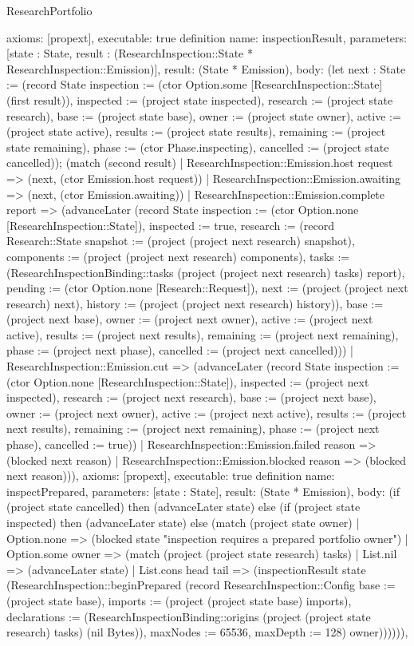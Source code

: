 \begin{lexlean}{ResearchPortfolio}
\begin{semanticmodule}
{ axioms: [propext],
 executable: true
}
definition{
 name: inspectionResult,
 parameters: [state : State, result : (ResearchInspection::State * ResearchInspection::Emission)],
 result: (State * Emission),
 body: (let next : State := (record State {inspection := (ctor Option.some [ResearchInspection::State] (first result)), inspected := (project state inspected), research := (project state research), base := (project state base), owner := (project state owner), active := (project state active), results := (project state results), remaining := (project state remaining), phase := (ctor Phase.inspecting), cancelled := (project state cancelled)}); (match (second result) | ResearchInspection::Emission.host request => (next, (ctor Emission.host request)) | ResearchInspection::Emission.awaiting => (next, (ctor Emission.awaiting)) | ResearchInspection::Emission.complete report => (advanceLater (record State {inspection := (ctor Option.none [ResearchInspection::State]), inspected := true, research := (record Research::State {snapshot := (project (project next research) snapshot), components := (project (project next research) components), tasks := (ResearchInspectionBinding::tasks (project (project next research) tasks) report), pending := (ctor Option.none [Research::Request]), next := (project (project next research) next), history := (project (project next research) history)}), base := (project next base), owner := (project next owner), active := (project next active), results := (project next results), remaining := (project next remaining), phase := (project next phase), cancelled := (project next cancelled)})) | ResearchInspection::Emission.cut => (advanceLater (record State {inspection := (ctor Option.none [ResearchInspection::State]), inspected := (project next inspected), research := (project next research), base := (project next base), owner := (project next owner), active := (project next active), results := (project next results), remaining := (project next remaining), phase := (project next phase), cancelled := true})) | ResearchInspection::Emission.failed reason => (blocked next reason) | ResearchInspection::Emission.blocked reason => (blocked next reason))),
 axioms: [propext],
 executable: true
}
definition{
 name: inspectPrepared,
 parameters: [state : State],
 result: (State * Emission),
 body: (if (project state cancelled) then (advanceLater state) else (if (project state inspected) then (advanceLater state) else (match (project state owner) | Option.none => (blocked state "inspection requires a prepared portfolio owner") | Option.some owner => (match (project (project state research) tasks) | List.nil => (advanceLater state) | List.cons head tail => (inspectionResult state (ResearchInspection::beginPrepared (record ResearchInspection::Config {base := (project state base), imports := (project (project state base) imports), declarations := (ResearchInspectionBinding::origins (project (project state research) tasks) (nil Bytes)), maxNodes := 65536, maxDepth := 128}) owner)))))),
}
\end{semanticmodule}
\end{lexlean}
